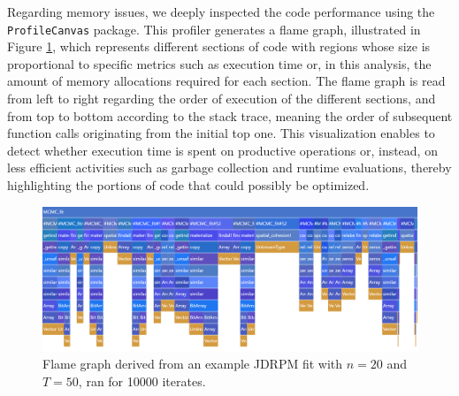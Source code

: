 \documentclass[12pt,	%
	a4paper,		%
	twoside,		%
	openright,		%
	titlepage,%
	]{book}
\theoremstyle{definition}
\newcommand{\mjline}[1]{\texttt{#1}}
\begin{document}
Regarding memory issues, we deeply inspected the code performance using the \mjline{ProfileCanvas} package. This profiler generates a flame graph, illustrated in Figure \ref{fig: flame graph}, which represents different sections of code with regions whose size is proportional to specific metrics such as execution time or, in this analysis, the amount of memory allocations required for each section. The flame graph is read from left to right regarding the order of execution of the different sections, and from top to bottom according to the stack trace, meaning the order of subsequent function calls originating from the initial top one. This visualization enables to detect whether execution time is spent on productive operations or, instead, on less efficient activities such as garbage collection and runtime evaluations, thereby highlighting the portions of code that could possibly be optimized.
\begin{figure}[!ht]
    \centering
    \includegraphics[width=1\linewidth]{Testing//Scaling possibilities/flame graph actual model allocs count.png}
    \caption[Flame graph derived from an example fit]{Flame graph derived from an example JDRPM fit with $n=20$ and $T=50$, ran for 10000 iterates.}
    \label{fig: flame graph}
\end{figure}
\end{document}
